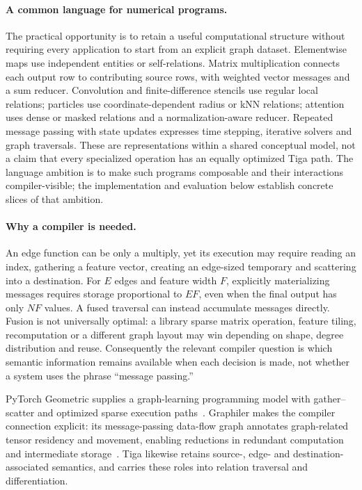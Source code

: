 \paragraph{A common language for numerical programs.}
The practical opportunity is to retain a useful computational structure without
requiring every application to start from an explicit graph dataset. Elementwise
maps use independent entities or self-relations. Matrix multiplication connects
each output row to contributing source rows, with weighted vector messages and
a sum reducer. Convolution and finite-difference stencils use regular local
relations; particles use coordinate-dependent radius or kNN relations; attention
uses dense or masked relations and a normalization-aware reducer. Repeated
message passing with state updates expresses time stepping, iterative solvers
and graph traversals. These are representations within a shared conceptual model,
not a claim that every specialized operation has an equally optimized Tiga path.
The language ambition is to make such programs composable and their interactions
compiler-visible; the implementation and evaluation below establish concrete
slices of that ambition.

\paragraph{Why a compiler is needed.}
An edge function can be only a multiply, yet its execution may require reading
an index, gathering a feature vector, creating an edge-sized temporary and
scattering into a destination. For $E$ edges and feature width $F$, explicitly
materializing messages requires storage proportional to $EF$, even when the
final output has only $NF$ values. A fused traversal can instead accumulate
messages directly. Fusion is not universally optimal: a library sparse matrix
operation, feature tiling, recomputation or a different graph layout may win
depending on shape, degree distribution and reuse. Consequently the relevant
compiler question is which semantic information remains available when each
decision is made, not whether a system uses the phrase ``message passing.''

PyTorch Geometric supplies a graph-learning programming model with gather--scatter
and optimized sparse execution paths~\cite{pyg,pyg2}. Graphiler makes the compiler connection explicit:
its message-passing data-flow graph annotates graph-related tensor residency and
movement, enabling reductions in redundant computation and intermediate
storage~\cite{graphiler}. Tiga likewise retains source-, edge- and
destination-associated semantics, and carries these roles into relation traversal
and differentiation.

